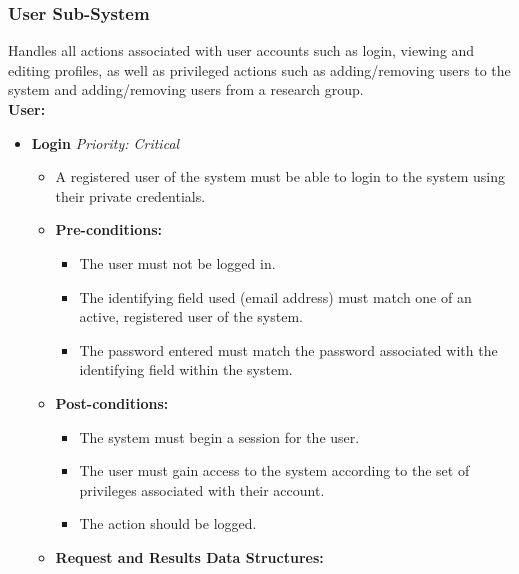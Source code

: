 \documentclass{article}
\begin{document}
			\subsubsection{User Sub-System}\label{subsubsec:user}
				Handles all actions associated with user accounts such as login, viewing and editing profiles, as well as privileged actions such as adding/removing users to the system and adding/removing users from a research group.\\
				[3mm]
				\textbf{User:}
				\begin{itemize}
					\item \textbf{Login} \hfill \textit{Priority: Critical}
					\begin{itemize}
						\item A registered user of the system must be able to login to the system using their private credentials.
						\item \textbf{Pre-conditions:}
						\begin{itemize}
							\item The user must not be logged in.
							\item The identifying field used (email address) must match one of an active, registered user of the system.
							\item The password entered must match the password associated with the identifying field within the system.
						\end{itemize}
						\item \textbf{Post-conditions:}
						\begin{itemize}
							\item The system must begin a session for the user.
							\item The user must gain access to the system according to the set of privileges associated with their account.		
							\item The action should be logged.
						\end{itemize}
						\item \textbf{Request and Results Data Structures:}
					\end{itemize}
					

\end{itemize}
\end{document}
